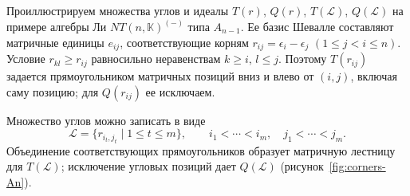 \documentclass[a4paper,14pt,oneside,openany]{memoir}
\begin{document}
Проиллюстрируем множества углов и идеалы $T(r)$, $Q(r)$, $T(\mathcal{L})$,
$Q(\mathcal{L})$ на примере алгебры Ли $NT(n,\mathbb{K})^{(-)}$ типа $A_{n-1}$.
Ее базис Шевалле составляют матричные единицы $e_{ij}$, соответствующие корням
$r_{ij}=\epsilon_i-\epsilon_j$ $(1\leq j<i\leq n)$. Условие $r_{kl}\geq r_{ij}$
равносильно неравенствам $k\geq i$, $l\leq j$. Поэтому $T(r_{ij})$ задается
прямоугольником матричных позиций вниз и влево от $(i,j)$, включая саму
позицию; для $Q(r_{ij})$ ее исключаем.

Множество углов можно записать в виде
\[
    \mathcal{L}=\{r_{i_t,j_t}\mid 1\leq t\leq m\},\qquad
    i_1<\cdots<i_m,\quad j_1<\cdots<j_m.
\]
Объединение соответствующих прямоугольников образует матричную лестницу для
$T(\mathcal{L})$; исключение угловых позиций дает $Q(\mathcal{L})$
(рисунок~\ref{fig:corners-An}).
\end{document}
